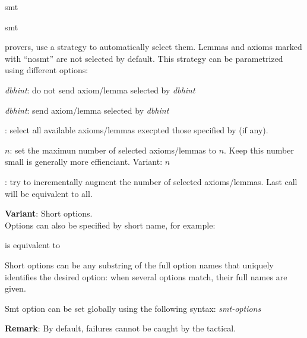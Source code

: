 \begin{tactic}{smt}
\begin{tsyntax}[empty]{smt}
\begin{compactitem}
       provers, \EasyCrypt use a strategy to automatically select
       them. Lemmas and axioms marked with ``nosmt'' are not selected
       by default. This strategy can be parametrized using different
       options:
           \begin{compactitem}
             \item {}\textit{dbhint}: do not send
               axiom/lemma selected by \textit{dbhint}
             \item {}\textit{dbhint}: send axiom/lemma
               selected by \textit{dbhint}
             \item {}: select all available axioms/lemmas
               execpted those specified by  (if
               any).
             \item {}$n$: set the maximun number of
               selected axioms/lemmas to $n$.  Keep this number small
               is generally more effienciant.  Variant: $n$
             \item {}: try to incrementally augment the
               number of selected axioms/lemmas. Last call will be
               equivalent to all.
           \end{compactitem}
  \end{compactitem}

  \textbf{Variant}: Short options.\\
  Options can also be specified by short name, for example:
  \begin{center}\end{center}
  is equivalent to 
  \begin{center}
  \end{center}
  Short options can be any substring of the full option names that
  uniquely identifies the desired option: when several options match,
  their full names are given.

  Smt option can be set globally using the following syntax:
   \textit{smt-options}

  \textbf{Remark}: By default,  failures cannot be caught by
  the  tactical.
  \end{tsyntax}
\end{tactic}
